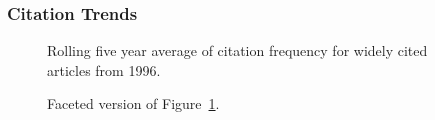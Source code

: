 \documentclass[
  10pt,
  letterpaper,
  DIV=11,
  numbers=noendperiod,
  twoside]{scrartcl}
\begin{document}
\subsubsection*{Citation Trends}\label{sec-trends-1996}

\begin{figure}


\caption{\label{fig-citation-spaghetti-1996}Rolling five year average of
citation frequency for widely cited articles from 1996.}

\end{figure}%

\begin{figure}


\caption{\label{fig-citation-facet-1996}Faceted version of
Figure~\ref{fig-citation-spaghetti-1996}.}

\end{figure}%
\end{document}
